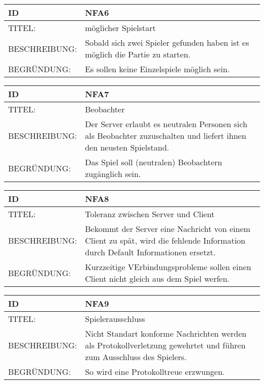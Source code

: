 \documentclass{uulm-assignment}
\begin{document}
    \begin{tabularx}{\textwidth}{|l|X |} \hline
        \textbf{ID} & \textbf{NFA6} \\
        \hline
        TITEL: &  möglicher Spielstart\\
        \hline
        BESCHREIBUNG: &  Sobald sich zwei Spieler gefunden haben ist es möglich die Partie zu starten.\\
        \hline
        BEGRÜNDUNG: &  Es sollen keine Einzelspiele möglich sein.\\
        \hline
    \end{tabularx}

    \begin{tabularx}{\textwidth}{|l|X |} \hline
        \textbf{ID} & \textbf{NFA7} \\
        \hline
        TITEL: &  Beobachter\\
        \hline
        BESCHREIBUNG: &  Der Server erlaubt es neutralen Personen sich als Beobachter zuzuschalten und liefert ihnen den neusten Spielstand.\\
        \hline
        BEGRÜNDUNG: &  Das Spiel soll (neutralen) Beobachtern zugänglich sein.\\
        \hline
    \end{tabularx}

    \begin{tabularx}{\textwidth}{|l|X |} \hline
        \textbf{ID} & \textbf{NFA8} \\
        \hline
        TITEL: &  Toleranz zwischen Server und Client\\
        \hline
        BESCHREIBUNG: &  Bekommt der Server eine Nachricht von einem Client zu spät, wird die fehlende Information durch Default Informationen ersetzt.\\
        \hline
        BEGRÜNDUNG: &  Kurzzeitige VErbindungsprobleme sollen einen Client nicht gleich aus dem Spiel werfen.\\
        \hline
    \end{tabularx}

    \begin{tabularx}{\textwidth}{|l|X |} \hline
        \textbf{ID} & \textbf{NFA9} \\
        \hline
        TITEL: &  Spielerausschluss\\
        \hline
        BESCHREIBUNG: &  Nicht Standart konforme Nachrichten werden als Protokollverletzung gewehrtet und führen zum Ausschluss des Spielers.\\
        \hline
        BEGRÜNDUNG: &  So wird eine Protokolltreue erzwungen.\\
        \hline
    \end{tabularx}
\end{document}
